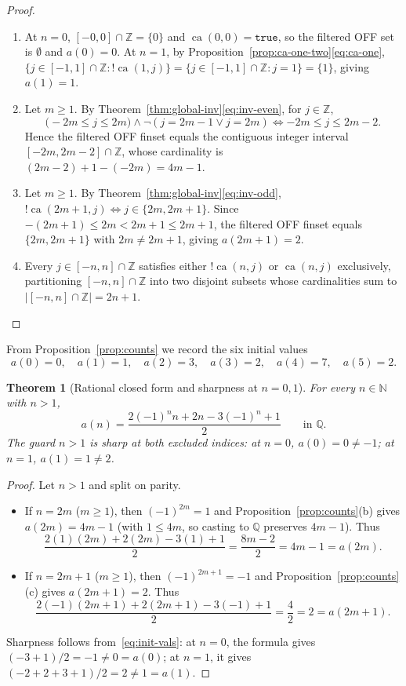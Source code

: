 \documentclass[11pt]{article}
\newtheorem{theorem}{Theorem}[section]
\theoremstyle{definition}
\newcommand{\N}{\mathbb{N}}
\newcommand{\Z}{\mathbb{Z}}
\newcommand{\Q}{\mathbb{Q}}
\newcommand{\ca}{\operatorname{ca}}
\begin{document}
\begin{proof}
\begin{enumerate}
\item[\textup{(a)}] At $n = 0$, $[-0, 0] \cap \Z = \{0\}$ and $\ca(0, 0) = \mathtt{true}$, so the filtered OFF set is $\emptyset$ and $a(0) = 0$. At $n = 1$, by Proposition~\ref{prop:ca-one-two}\eqref{eq:ca-one}, $\{j \in [-1, 1] \cap \Z : !\ca(1, j)\} = \{j \in [-1, 1] \cap \Z : j = 1\} = \{1\}$, giving $a(1) = 1$.
\item[\textup{(b)}] Let $m \ge 1$. By Theorem~\ref{thm:global-inv}\eqref{eq:inv-even}, for $j \in \Z$,
\[
\bigl(-2m \le j \le 2m\bigr) \land \neg(j = 2m - 1 \lor j = 2m) \iff -2m \le j \le 2m - 2.
\]
Hence the filtered OFF finset equals the contiguous integer interval $[-2m, 2m - 2] \cap \Z$, whose cardinality is $(2m - 2) + 1 - (-2m) = 4m - 1$.
\item[\textup{(c)}] Let $m \ge 1$. By Theorem~\ref{thm:global-inv}\eqref{eq:inv-odd}, $!\ca(2m + 1, j) \iff j \in \{2m, 2m + 1\}$. Since $-(2m + 1) \le 2m < 2m + 1 \le 2m + 1$, the filtered OFF finset equals $\{2m, 2m + 1\}$ with $2m \ne 2m + 1$, giving $a(2m + 1) = 2$.
\item[\textup{(d)}] Every $j \in [-n, n] \cap \Z$ satisfies either $!\ca(n, j)$ or $\ca(n, j)$ exclusively, partitioning $[-n, n] \cap \Z$ into two disjoint subsets whose cardinalities sum to $|[-n, n] \cap \Z| = 2n + 1$. \qedhere
\end{enumerate}
\end{proof}

From Proposition~\ref{prop:counts} we record the six initial values
\begin{equation}
\label{eq:init-vals}
a(0) = 0, \quad a(1) = 1, \quad a(2) = 3, \quad a(3) = 2, \quad a(4) = 7, \quad a(5) = 2.
\end{equation}

\begin{theorem}[Rational closed form and sharpness at $n = 0, 1$]
\label{thm:closed-form}
For every $n \in \N$ with $n > 1$,
\[
a(n) = \frac{2(-1)^n n + 2n - 3(-1)^n + 1}{2} \qquad \text{in }\Q.
\]
The guard $n > 1$ is sharp at both excluded indices: at $n = 0$, $a(0) = 0 \ne -1$; at $n = 1$, $a(1) = 1 \ne 2$.
\end{theorem}

\begin{proof}
Let $n > 1$ and split on parity.
\begin{itemize}
\item If $n = 2m$ ($m \ge 1$), then $(-1)^{2m} = 1$ and Proposition~\ref{prop:counts}(b) gives $a(2m) = 4m - 1$ (with $1 \le 4m$, so casting to $\Q$ preserves $4m - 1$). Thus
\[
\frac{2(1)(2m) + 2(2m) - 3(1) + 1}{2} = \frac{8m - 2}{2} = 4m - 1 = a(2m).
\]
\item If $n = 2m + 1$ ($m \ge 1$), then $(-1)^{2m+1} = -1$ and Proposition~\ref{prop:counts}(c) gives $a(2m + 1) = 2$. Thus
\[
\frac{2(-1)(2m + 1) + 2(2m + 1) - 3(-1) + 1}{2} = \frac{4}{2} = 2 = a(2m + 1).
\]
\end{itemize}
Sharpness follows from~\eqref{eq:init-vals}: at $n = 0$, the formula gives $(-3 + 1)/2 = -1 \ne 0 = a(0)$; at $n = 1$, it gives $(-2 + 2 + 3 + 1)/2 = 2 \ne 1 = a(1)$.
\end{proof}
\end{document}
